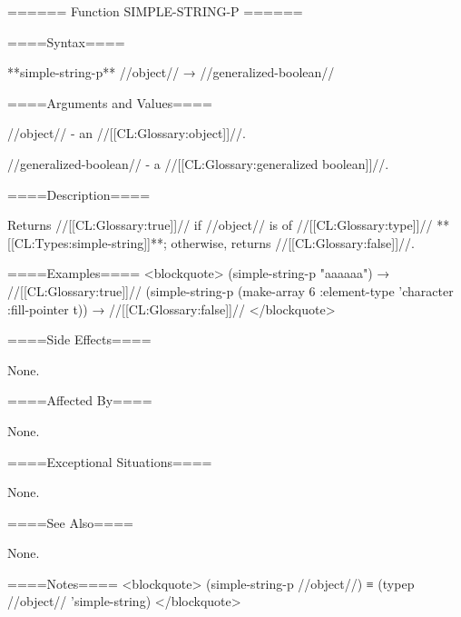 ====== Function SIMPLE-STRING-P ======

====Syntax====

**simple-string-p** //object// → //generalized-boolean//

====Arguments and Values====

//object// - an //[[CL:Glossary:object]]//.

//generalized-boolean// - a //[[CL:Glossary:generalized boolean]]//.

====Description====

Returns //[[CL:Glossary:true]]// if //object// is of //[[CL:Glossary:type]]// **[[CL:Types:simple-string]]**; otherwise, returns //[[CL:Glossary:false]]//.

====Examples==== <blockquote> (simple-string-p "aaaaaa") → //[[CL:Glossary:true]]// (simple-string-p (make-array 6 :element-type 'character :fill-pointer t)) → //[[CL:Glossary:false]]// </blockquote>

====Side Effects====

None.

====Affected By====

None.

====Exceptional Situations====

None.

====See Also====

None.

====Notes==== <blockquote> (simple-string-p //object//) ≡ (typep //object// 'simple-string) </blockquote>

